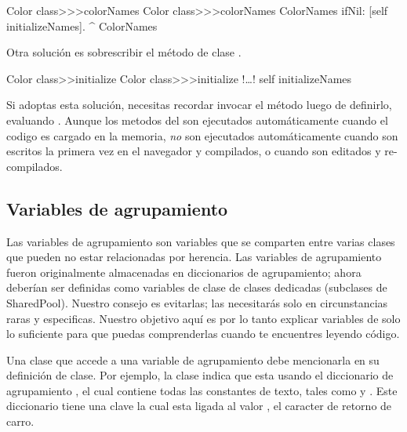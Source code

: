 \documentclass[a4paper,10pt,twoside]{book}
\begin{document}
\begin{method}[colorclasscolornames]{Color class>>>colorNames}
Color class>>>colorNames	
	ColorNames ifNil: [self initializeNames].
	^ ColorNames
\end{method}	

Otra soluci\'on es sobrescribir el m\'etodo de clase .

\begin{method}[colorclassinit]{Color class>>initialize}
Color class>>>initialize	
	!\ldots!
	self initializeNames
\end{method}	

\noindent
Si adoptas esta soluci\'on, necesitas recordar invocar el m\'etodo  luego de definirlo, \eg evaluando .
Aunque los metodos  del  son ejecutados autom\'{a}ticamente cuando el codigo es cargado en la memoria, \emph{no} son ejecutados autom\'{a}ticamente cuando son escritos la primera vez en el navegador y compilados, o cuando son editados y re-compilados.

\subsection{Variables de agrupamiento}
Las variables de agrupamiento son variables que se comparten entre varias clases que pueden no estar relacionadas por herencia.
Las variables de agrupamiento fueron originalmente almacenadas en diccionarios de agrupamiento; ahora deber\'ian ser definidas como variables de clase de clases dedicadas (subclases de SharedPool). Nuestro consejo es evitarlas; las necesitar\'as solo en circunstancias raras y especificas. Nuestro objetivo aqu\'i es por lo tanto explicar variables de  solo lo suficiente para que puedas comprenderlas cuando te encuentres leyendo c\'odigo.

Una clase que accede a una variable de agrupamiento debe mencionarla en su definici\'on de clase. Por ejemplo, la clase  indica que esta usando el diccionario de agrupamiento , el cual contiene todas las constantes de texto, tales como  y .
Este diccionario tiene una clave  la cual esta ligada al valor , \ie el caracter de retorno de carro.
\end{document}
